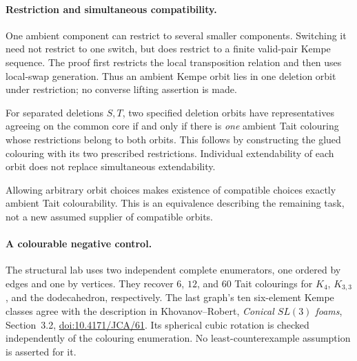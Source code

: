 \paragraph{Restriction and simultaneous compatibility.}
One ambient component can restrict to several smaller components.
Switching it need not restrict to one switch, but does restrict to a
finite valid-pair Kempe sequence. The proof first restricts the local
transposition relation and then uses local-swap generation. Thus an ambient
Kempe orbit lies in one deletion orbit under restriction; no converse
lifting assertion is made.

For separated deletions $S,T$, two specified deletion orbits have
representatives agreeing on the common core if and only if there is
\emph{one} ambient Tait colouring whose restrictions belong to both
orbits. This follows by constructing the glued colouring with its two
prescribed restrictions. Individual extendability of each orbit does
not replace simultaneous extendability.

Allowing arbitrary orbit choices makes existence of compatible choices
exactly ambient Tait colourability. This is an equivalence describing the
remaining task, not a new assumed supplier of compatible orbits.

\paragraph{A colourable negative control.}
The structural lab uses two independent complete enumerators, one ordered
by edges and one by vertices. They recover $6$, $12$, and $60$ Tait
colourings for $K_4$, $K_{3,3}$, and the dodecahedron, respectively.
The last graph's ten six-element Kempe classes agree with the description
in Khovanov--Robert, \emph{Conical $SL(3)$ foams}, Section~3.2,
\href{https://doi.org/10.4171/JCA/61}{doi:10.4171/JCA/61}.
Its spherical cubic rotation is checked independently of the colouring
enumeration. No least-counterexample assumption is asserted for it.

